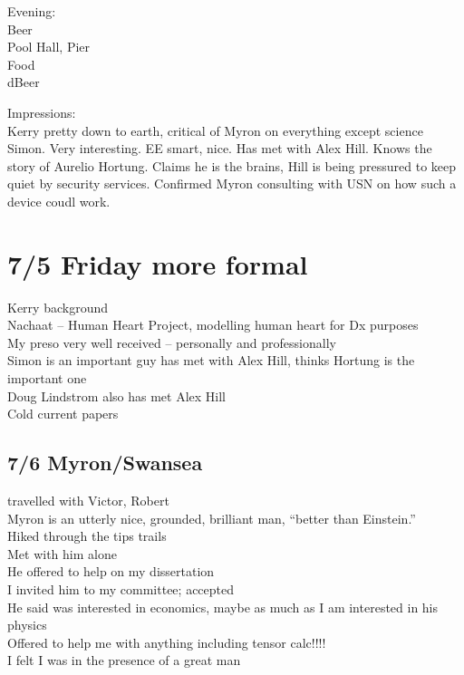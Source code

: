 \documentclass[final]{beamer}
\begin{document}
\begin{frame}
Evening:\\
Beer\\
Pool Hall, Pier\\
Food\\
dBeer\\
\end{frame}

\begin{frame}
Impressions:\\
Kerry pretty down to earth, critical of Myron on everything except science\\
Simon. Very interesting. EE smart, nice. Has met with Alex Hill. Knows the story of Aurelio Hortung. Claims he is the brains, Hill is being pressured to keep quiet by security services. Confirmed Myron consulting with USN on how such a device coudl work.\\
\end{frame}

\section{7/5 Friday more formal}

\begin{frame}
Kerry background\\
Nachaat -- Human Heart Project, modelling human heart for Dx purposes\\
My preso very well received -- personally and professionally\\
Simon is an important guy has met with Alex Hill, thinks Hortung is the important one\\
Doug Lindstrom also has met Alex Hill\\
Cold current papers\\
\end{frame}

\begin{frame}
\section{7/6 Myron/Swansea}
travelled with Victor, Robert\\
Myron is an utterly nice, grounded, brilliant man, ``better than Einstein.''\\
Hiked through the tips trails\\
Met with him alone\\
He offered to help on my dissertation\\
I invited him to my committee; accepted\\
He said was interested in economics, maybe as much as I am interested in his physics\\
Offered to help me with anything including tensor calc!!!!\\
I felt I was in the presence of a great man\\
\end{frame}
\end{document}
